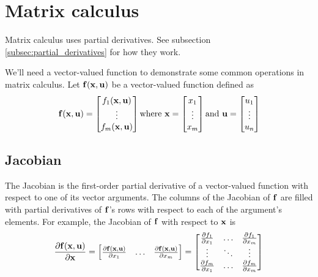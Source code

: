 \section{Matrix calculus}
\label{sec:matrix_calculus}

Matrix calculus uses partial derivatives. See subsection
\ref{subsec:partial_derivatives} for how they work.

We'll need a vector-valued function to demonstrate some common operations in
matrix calculus. Let $\mathbf{f}(\mathbf{x}, \mathbf{u})$ be a vector-valued function
defined as
\begin{equation*}
  \mathbf{f}(\mathbf{x}, \mathbf{u}) =
  \begin{bmatrix}
    f_1(\mathbf{x}, \mathbf{u}) \\
    \vdots \\
    f_m(\mathbf{x}, \mathbf{u})
  \end{bmatrix}
  \text{where }
  \mathbf{x} =
  \begin{bmatrix}
    x_1 \\
    \vdots \\
    x_m
  \end{bmatrix}
  \text{and }
  \mathbf{u} =
  \begin{bmatrix}
    u_1 \\
    \vdots \\
    u_n
  \end{bmatrix}
\end{equation*}

\subsection{Jacobian}

The Jacobian is the first-order partial derivative of a vector-valued function
with respect to one of its vector arguments. The columns of the Jacobian of
$\mathbf{f}$ are filled with partial derivatives of $\mathbf{f}$'s rows with respect
to each of the argument's elements. For example, the Jacobian of $\mathbf{f}$ with
respect to $\mathbf{x}$ is
\begin{equation*}
  \frac{\partial \mathbf{f}(\mathbf{x}, \mathbf{u})}{\partial \mathbf{x}} =
  \begin{bmatrix}
    \frac{\partial \mathbf{f}(\mathbf{x}, \mathbf{u})}{\partial x_1} & \hdots &
      \frac{\partial \mathbf{f}(\mathbf{x}, \mathbf{u})}{\partial x_m}
  \end{bmatrix} =
  \begin{bmatrix}
    \frac{\partial f_1}{\partial x_1} & \hdots &
      \frac{\partial f_1}{\partial x_m} \\
    \vdots & \ddots & \vdots \\
    \frac{\partial f_m}{\partial x_1} & \hdots &
      \frac{\partial f_m}{\partial x_m}
  \end{bmatrix}
\end{equation*}

